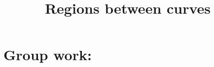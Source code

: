 \documentclass[]{ximera}
\title{Regions between curves}
\begin{document}
\begin{abstract}		\end{abstract}
\maketitle

\section{Group work:}
\end{document}
